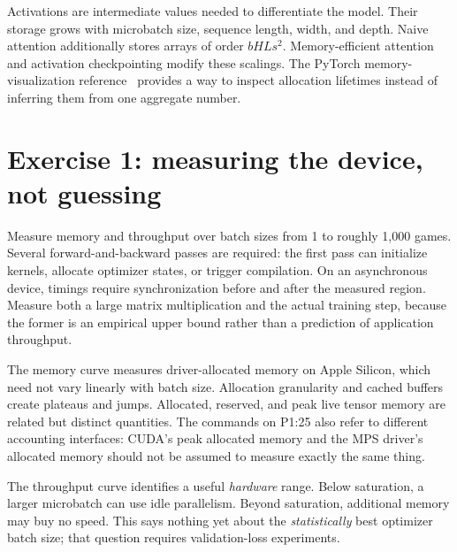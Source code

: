 Activations are intermediate values needed to differentiate the model. Their storage grows with microbatch size, sequence length, width, and depth. Naive attention additionally stores arrays of order $bHLs^2$. Memory-efficient attention and activation checkpointing modify these scalings. The PyTorch memory-visualization reference~\cite{pytorchmem} provides a way to inspect allocation lifetimes instead of inferring them from one aggregate number.


\section{Exercise 1: measuring the device, not guessing}
Measure memory and throughput over batch sizes from 1 to roughly 1,000 games. Several forward-and-backward passes are required: the first pass can initialize kernels, allocate optimizer states, or trigger compilation. On an asynchronous device, timings require synchronization before and after the measured region. Measure both a large matrix multiplication and the actual training step, because the former is an empirical upper bound rather than a prediction of application throughput.


The memory curve measures driver-allocated memory on Apple Silicon, which need not vary linearly with batch size. Allocation granularity and cached buffers create plateaus and jumps. Allocated, reserved, and peak live tensor memory are related but distinct quantities. The commands on P1:25 also refer to different accounting interfaces: CUDA's peak allocated memory and the MPS driver's allocated memory should not be assumed to measure exactly the same thing.

The throughput curve identifies a useful \emph{hardware} range. Below saturation, a larger microbatch can use idle parallelism. Beyond saturation, additional memory may buy no speed. This says nothing yet about the \emph{statistically} best optimizer batch size; that question requires validation-loss experiments.

